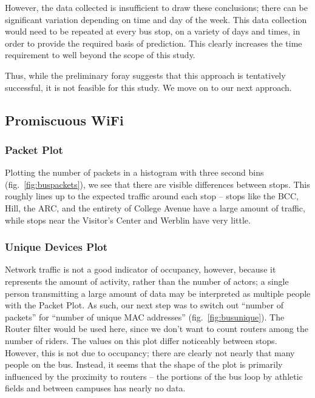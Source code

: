 However, the data collected is insufficient to draw these conclusions; there can be significant variation depending on time and day of the week.
This data collection would need to be repeated at every bus stop, on a variety of days and times, in order to provide the required basis of prediction.
This clearly increases the time requirement to well beyond the scope of this study.
	
Thus, while the preliminary foray suggests that this approach is tentatively successful, it is not feasible for this study.
We move on to our next approach.

\subsection{Promiscuous WiFi}
    
\subsubsection*{Packet Plot}

Plotting the number of packets in a histogram with three second bins (fig.~\ref{fig:buspackets}), we see that there are visible differences between stops.
This roughly lines up to the expected traffic around each stop -- stops like the BCC, Hill, the ARC, and the entirety of College Avenue have a large amount of traffic, while stops near the Visitor's Center and Werblin have very little.

\subsubsection*{Unique Devices Plot}

Network traffic is not a good indicator of occupancy, however, because it represents the amount of activity, rather than the number of actors; a single person transmitting a large amount of data may be interpreted as multiple people with the Packet Plot.
As such, our next step was to switch out ``number of packets'' for ``number of unique MAC addresses'' (fig.~\ref{fig:busunique}).
The Router filter would be used here, since we don't want to count routers among the number of riders.
The values on this plot differ noticeably between stops.
However, this is not due to occupancy; there are clearly not nearly that many people on the bus.
Instead, it seems that the shape of the plot is primarily influenced by the proximity to routers -- the portions of the bus loop by athletic fields and between campuses has nearly no data.


